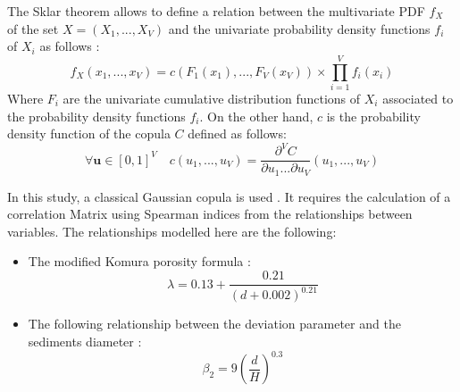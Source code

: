 The Sklar theorem \cite{bib5} allows to define a relation between the multivariate PDF $f_X$ of the set $X=(X_1,...,X_V)$ and the univariate probability density functions $f_i$ of $X_i$ as follows :
\begin{equation}
f_X(x_1,...,x_V)=c(F_1(x_1),...,F_V(x_V))\times\prod^{V}_{i=1}f_{i}(x_i)
\end{equation}
Where $F_i$ are the univariate cumulative distribution functions of $X_i$ associated to the probability density functions $f_i$. On the other hand, $c$ is the probability density function of the copula $C$ defined as follows:
\begin{equation}
\forall \textbf{u} \in [0,1]^V \quad c(u_1,...,u_V) = \dfrac{\partial^V C}{\partial u_1...\partial u_V}(u_1,...,u_V)
\end{equation}

In this study, a classical Gaussian copula is used \cite{bib11}. It requires the calculation of a correlation Matrix using Spearman indices\cite{bib11} from the relationships between variables. The relationships modelled here are the following:
\begin{itemize}
\item The modified Komura porosity formula \cite{bib8}:
\begin{equation}
\lambda = 0.13 + \dfrac{0.21}{(d+0.002)^{0.21}}
\end{equation}
\item The following relationship between the deviation parameter and the sediments diameter \cite{bib9}:
\begin{equation}
\beta_2 = 9 \left(\dfrac{d}{H}\right)^{0.3}
\end{equation}
\end{itemize}


